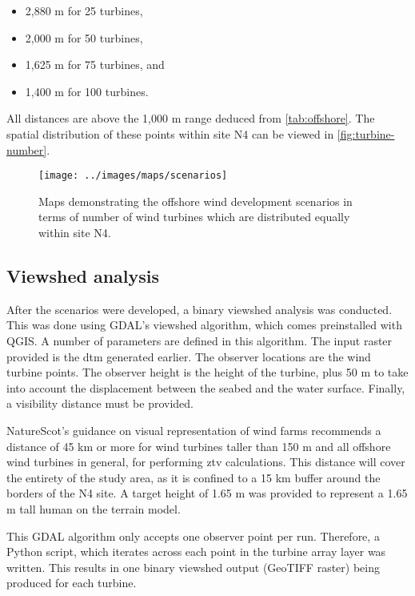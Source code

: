 \begin{itemize}[noitemsep]
  \item 2,880 m for 25 turbines,
  \item 2,000 m for 50 turbines,
  \item 1,625 m for 75 turbines, and
  \item 1,400 m for 100 turbines.
\end{itemize}

All distances are above the 1,000 m range deduced from \autoref{tab:offshore}. The spatial distribution of these points within site N4 can be viewed in \autoref{fig:turbine-number}.

\begin{figure}
  \centering
  \texttt{[image: ../images/maps/scenarios]}
  \caption{Maps demonstrating the offshore wind development scenarios in terms of number of wind turbines which are distributed equally within site N4. \label{fig:turbine-number}}
\end{figure}

\newpage
\subsection{Viewshed analysis}

After the scenarios were developed, a binary viewshed analysis was conducted. This was done using GDAL's viewshed algorithm, which comes preinstalled with QGIS. A number of parameters are defined in this algorithm. The input raster provided is the \gls{dtm} generated earlier. The observer locations are the wind turbine points. The observer height is the height of the turbine, plus 50 m to take into account the displacement between the seabed and the water surface. Finally, a visibility distance must be provided.

NatureScot's guidance on visual representation of wind farms \autocite{naturescot-visual} recommends a distance of 45 km or more for wind turbines taller than 150 m and all offshore wind turbines in general, for performing \gls{ztv} calculations. This distance will cover the entirety of the study area, as it is confined to a 15 km buffer around the borders of the N4 site. A target height of 1.65 m was provided to represent a 1.65 m tall human on the terrain model.

This GDAL algorithm only accepts one observer point per run. Therefore, a Python script, which iterates across each point in the turbine array layer was written. This results in one binary viewshed output (GeoTIFF raster) being produced for each turbine.

